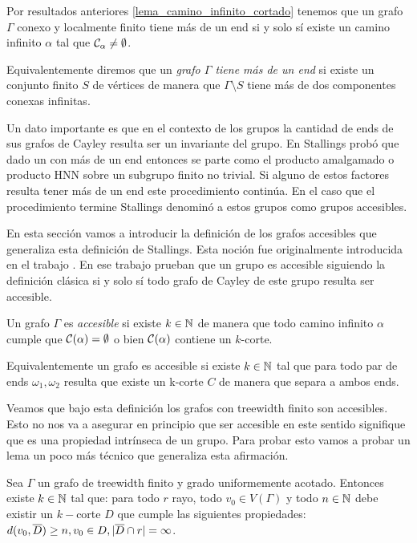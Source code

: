 \documentclass[tesis.tex]{subfiles}
\begin{document}
Por resultados anteriores \ref{lema_camino_infinito_cortado} tenemos que un grafo $\Gamma$ conexo y localmente finito tiene más de un end si y solo sí existe un camino infinito $\alpha$ tal que ${\cal C}_{\alpha} \neq \emptyset$.

Equivalentemente diremos que un \emph{grafo $\Gamma$ tiene más de un end} si existe un conjunto finito $S$ de vértices de manera que $\Gamma \setminus S$ tiene más de dos componentes conexas infinitas.

Un dato importante es que en el contexto de los grupos la cantidad de ends de sus grafos de Cayley resulta ser un invariante del grupo.
En \cite{stallings1971group} Stallings probó que dado un \fg con más de un end entonces se parte como el producto amalgamado o producto HNN sobre un subgrupo finito no trivial.
Si alguno de estos factores resulta tener más de un end este procedimiento continúa.
En el caso que el procedimiento termine Stallings denominó a estos grupos como grupos accesibles. 

En esta sección vamos a introducir la definición de los grafos accesibles que generaliza esta definición de Stallings.
Esta noción fue originalmente introducida en el trabajo \cite{thomassen1993vertex}.
En ese trabajo prueban que un grupo es accesible siguiendo la definición clásica si y solo sí todo grafo de Cayley de este grupo resulta ser accesible.
\begin{deff}
	Un grafo $\Gamma$ es \emph{accesible} si existe $k \in \mathbb{N}$ de manera que todo camino infinito $\alpha$ cumple que ${\cal C}(\alpha) = \emptyset$ o bien ${\cal C}(\alpha)$ contiene un $k$-corte.
\end{deff}
Equivalentemente un grafo es accesible si existe $k \in \mathbb{N}$ tal que para todo par de ends $\omega_1, \omega_2$ resulta que existe un k-corte $C$ de manera que separa a ambos ends.


Veamos que bajo esta definición los grafos con treewidth finito son accesibles.
Esto no nos va a asegurar en principio que ser accesible en este sentido signifique que es una propiedad intrínseca de un grupo.
Para probar esto vamos a probar un lema un poco más técnico que generaliza esta afirmación.

\begin{lema}\label{lema_corte_treewidth}
	Sea $\Gamma$ un grafo de treewidth finito y grado uniformemente acotado.
	Entonces existe $k \in \mathbb{N}$ tal que:
	para todo $r$ rayo, todo $v_0 \in V(\Gamma)$ y todo $n \in \mathbb{N}$ debe existir un $k-$corte $D$ que cumple las siguientes propiedades: $d(v_0,\overline D) \ge n, v_0 \in D, |\overline D \cap r| = \infty$. 
\end{lema}
\end{document}
